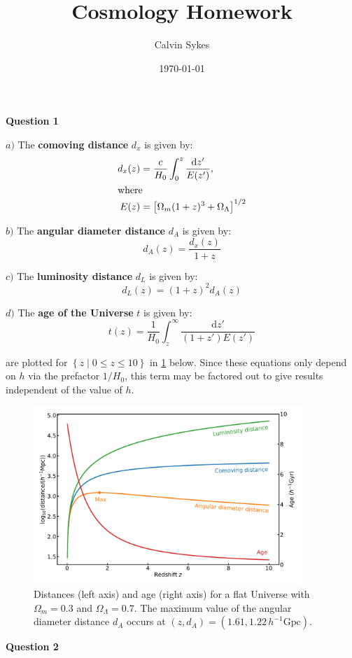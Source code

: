 \documentclass{article}
\title{Cosmology Homework}
\author{Calvin Sykes}
\date{\today}
\begin{document}
\maketitle

{\large {\bfseries Question 1}}

$a)$ The {\bf comoving distance} $d_x$ is given by:
\begin{align}
  d_x(z)&=\frac{c}{H_0}\int_0^z\frac{\mathrm{d}z'}{E(z')},\label{eq:1a}\\
  \shortintertext{where}
  E(z)&=\left[\Omega_m(1+z)^3+\Omega_\Lambda\right]^{1/2}\nonumber
\end{align}

$b)$ The {\bf angular diameter distance} $d_A$ is given by:
\begin{equation}
  d_A(z)=\frac{d_x(z)}{1+z}\label{eq:1b}
\end{equation}

$c)$ The {\bf luminosity distance} $d_L$ is given by:
\begin{equation}
  d_L(z)=(1+z)^2 d_A(z)\label{eq:1c}
\end{equation}

$d)$ The {\bf age of the Universe} $t$ is given by:
\begin{equation}
  t(z)=\frac{1}{H_0}\int_z^\infty\frac{\mathrm{d}z'}{(1+z')E(z')}\label{eq:1d}
\end{equation}

 are plotted for $\left\{z \mid 0\leq z \leq 10\right\}$ in \cref{fig:q1} below. Since these equations only depend on $h$ via the prefactor $1/H_0$, this term may be factored out to give results independent of the value of $h$.

\begin{figure}[hb]
  \centering
  \includegraphics[width=0.9\textwidth]{q1_plot}
  \caption{Distances (left axis) and age (right axis) for a flat Universe with $\Omega_m=0.3$ and $\Omega_\Lambda=0.7$. The maximum value of the angular diameter distance $d_A$ occurs at $(z,d_A)=(1.61,1.22\,h^{-1}\mathrm{Gpc})$.}
  \label{fig:q1}
\end{figure}
\newpage
{\large {\bf Question 2}}
\end{document}

